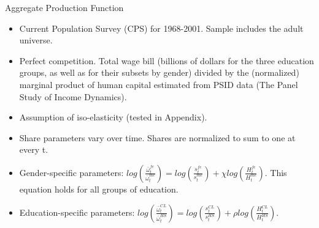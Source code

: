 \documentclass{beamer}
\begin{document}
\begin{frame}[label=Production1]{Aggregate Production Function}
\hyperlink{Return1}{}
\begin{itemize}
\item Current Population Survey (CPS) for 1968-2001. Sample includes the adult universe.
\item Perfect competition. Total wage bill (billions of dollars for the three education groups, as well as for their subsets by gender) divided by the (normalized) marginal product of human capital estimated from PSID data (The Panel Study of Income Dynamics).
\item Assumption of iso-elasticity (tested in Appendix).
\item Share parameters vary over time. Shares are normalized to sum to one at every t.
\item Gender-specific parameters: $log(\frac{\bar{\omega}_t^{fe}}{\bar{\omega}_t^{me}})=log(\frac{s_t^{fe}}{s_t^{me}})+\chi log(\frac{H_t^{fe}}{H_t^{me}})$. This equation holds for all groups of education.
\item Education-specific parameters: $log(\frac{\bar{\omega}_t^{CL}}{\bar{\omega}_t^{HS}})=log(\frac{s_t^{CL}}{s_t^{HS}})+\rho log(\frac{H_t^{CL}}{H_t^{HS}})$.

\end{itemize}
\end{frame}
\end{document}

